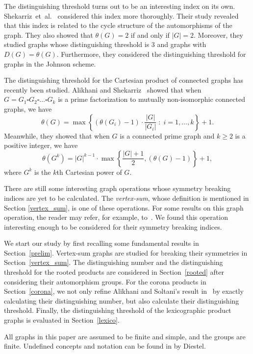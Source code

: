 \documentclass[12pt,a4paper, longbibliography]{article}
\theoremstyle{definition}
\numberwithin{equation}{section}
\begin{document}
	The distinguishing threshold turns out  to be an interesting index on its own. Shekarriz~et~al.~\cite{ShekarrizAhmadiTH2021-theta} considered this index more thoroughly. Their study revealed that this index is related to the cycle structure of the automorphisms of the graph. They also showed that $\theta(G)=2$ if and only if $\vert G\vert = 2$. Moreover, they studied graphs whose distinguishing threshold is 3 and graphs with $D(G)=\theta(G)$. Furthermore, they considered the distinguishing  threshold for graphs in the Johnson scheme.
	
	The distinguishing threshold for the Cartesian product of connected graphs has recently been studied. Alikhani and Shekarriz~\cite{Shekarriz2021Cartesian} showed that when $G=G_1\square G_2 \square \ldots \square G_k$ is a prime factorization to mutually non-isomorphic connected graphs, we have 
	\[
	\theta (G)=\max \left\{ \left(\theta(G_i)-1\right)\cdot \frac{\vert G\vert}{\vert G_i \vert} \; : \; i=1,\dots,k \right\}+1.
	\]
	 Meanwhile, they showed that when $G$ is a connected prime graph and $k\geq 2$ is a positive integer, we have 
	\[
	\theta (G^k)=\vert G\vert^{k-1}\cdot\max\left\{ \frac{\vert G\vert +1}{2}, \left(\theta(G)-1\right)\right\}+1,
	\]
	where $G^k$ is the $k$th Cartesian power of $G$. 
	
	There are still some interesting graph operations whose symmetry breaking indices are yet to be calculated.	The \emph{vertex-sum}, whose definition is mentioned in Section \ref{vertex_sum}, is one of these operations. For some results on this graph operation, the reader may refer, for example, to~\cite{Barioli2004,Huang2010}. We found this operation interesting enough to be considered for their symmetry breaking indices.
	
	We start our study by first recalling  some fundamental results in Section~\ref{prelim}. Vertex-sum graphs are studied for breaking their symmetries in Section~\ref{vertex_sum}. The distinguishing number and the distinguishing threshold for the rooted products are  considered in Section~\ref{rooted} after considering their automorphism groups. For the corona products in Section~\ref{corona}, we not only refine Alikhani and Soltani's result in~\cite{Alikhani2017corona} by exactly calculating their distinguishing number, but also calculate their distinguishing threshold. Finally, the distinguishing threshold of the  lexicographic product graphs is evaluated  in Section~\ref{lexico}.
	
	All graphs in this paper are assumed to be  finite and simple, and the groups are finite. Undefined concepts and notation can be found in \cite{diestel2017} by Diestel. 
	
\end{document}
